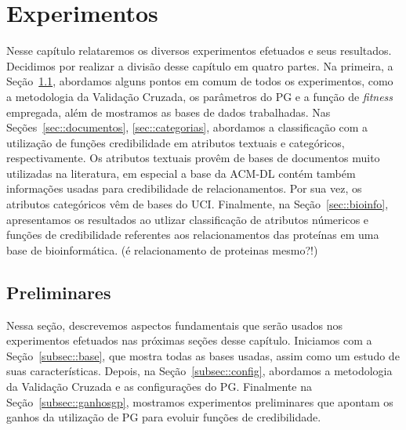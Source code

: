 \newcommand{\triangOK}{\textcolor[rgb]{00,0.45,0.10}{$\blacktriangle$}}
\newcommand{\triangBAD}{\textcolor[rgb]{0.7,00,00}{$\blacktriangledown$}}
\newcommand{\ball}{\textcolor[rgb]{0.7,0.70,0.0}{$\bullet$}}



\chapter{Experimentos}
\label{cap::experimentos}


Nesse capítulo relataremos os diversos experimentos efetuados e seus resultados.
Decidimos por realizar a divisão desse capítulo em quatro partes.
Na primeira, a Seção~\ref{sec::preliminares}, abordamos alguns pontos em comum de todos os experimentos, como a metodologia da Validação Cruzada, os parâmetros do \textsc{PG} e a função de \textit{fitness} empregada, além de mostramos as bases de dados trabalhadas.
Nas Seções~\ref{sec::documentos}, \ref{sec::categorias}, abordamos a classificação com a utilização de funções credibilidade em atributos textuais e categóricos, respectivamente.
Os atributos textuais provêm de bases de documentos muito utilizadas na literatura, em especial a base da \textsc{ACM-DL} contém também informações usadas para credibilidade de relacionamentos.
Por sua vez, os atributos categóricos vêm de bases do \textsc{UCI}.
Finalmente, na Seção~\ref{sec::bioinfo}, apresentamos os resultados ao utlizar classificação de atributos númericos e funções de credibilidade referentes aos relacionamentos das proteínas em uma base de bioinformática. (é relacionamento de proteinas mesmo?!)




\section{Preliminares}
\label{sec::preliminares}

Nessa seção, descrevemos aspectos fundamentais que serão usados nos experimentos efetuados nas próximas seções desse capítulo. 
Iniciamos com a Seção~\ref{subsec::base}, que mostra todas as bases usadas, assim como um estudo de suas características.
Depois, na Seção~\ref{subsec::config}, abordamos a metodologia da Validação Cruzada e as configurações do \textsc{PG}.
Finalmente na Seção~\ref{subsec::ganhosgp}, mostramos experimentos preliminares que apontam os ganhos da utilização de \textsc{PG} para evoluir funções de credibilidade.


